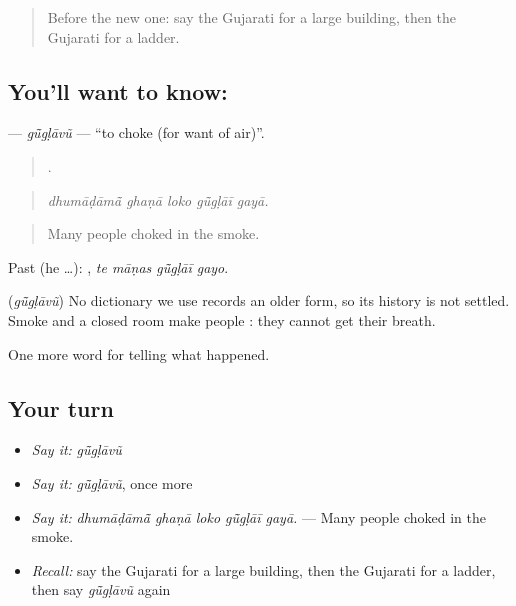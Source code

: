 \label{lesson:GU-C301-guglavu}



\begin{quote}
Before the new one: say the Gujarati for a large building, then the Gujarati for a ladder.
\end{quote}

\subsection*{You'll want to know: }
\textbf{} — \emph{gū̃gḷāvũ} — \textquotedblleft{}to choke (for want of air)\textquotedblright{}.

\begin{quote}
    .
\end{quote}

\begin{quote}
\emph{dhumāḍāmā̃ ghaṇā loko gū̃gḷāī gayā.}
\end{quote}

\begin{quote}
Many people choked in the smoke.
\end{quote}

Past (he …):    , \emph{te māṇas gū̃gḷāī gayo}.

\begin{cousinweb}
\textbf{} (\emph{gū̃gḷāvũ}) No dictionary we use records an older form, so its history is not settled. Smoke and a closed room make people \textbf{ }: they cannot get their breath.
\end{cousinweb}

\begin{grammarlens}[title={What you've built}]
One more word for telling what happened.
\end{grammarlens}

\subsection*{Your turn}
\begin{itemize}
\raggedright
  \item \emph{Say it:} \emph{gū̃gḷāvũ}
  \item \emph{Say it:} \emph{gū̃gḷāvũ}, once more
  \item \emph{Say it:} \emph{dhumāḍāmā̃ ghaṇā loko gū̃gḷāī gayā.} — Many people choked in the smoke.
  \item \emph{Recall:} say the Gujarati for a large building, then the Gujarati for a ladder, then say \emph{gū̃gḷāvũ} again
\end{itemize}

